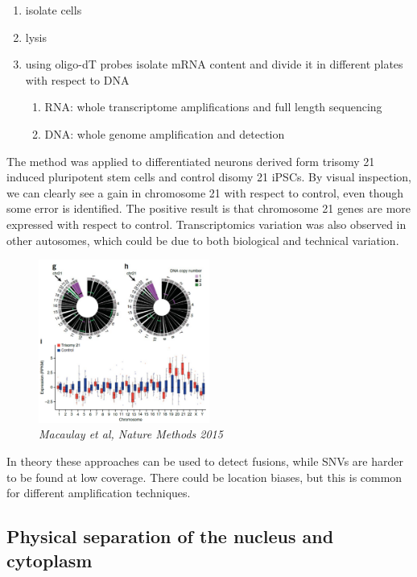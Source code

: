 \begin{enumerate}
\def\labelenumi{\arabic{enumi}.}
\tightlist
\item
  isolate cells
\item
  lysis
\item
  using oligo-dT probes isolate mRNA content and divide it in different
  plates with respect to DNA

  \begin{enumerate}
  \def\labelenumii{\arabic{enumii}.}
  \tightlist
  \item
    RNA: whole transcriptome amplifications and full length sequencing
  \item
    DNA: whole genome amplification and detection
  \end{enumerate}
\end{enumerate}

The method was applied to differentiated neurons derived form trisomy 21
induced pluripotent stem cells and control disomy 21 iPSCs. By visual
inspection, we can clearly see a gain in chromosome 21 with respect to
control, even though some error is identified. The positive
result is that chromosome 21 genes are more expressed with respect to
control. Transcriptomics variation was also observed in other autosomes,
which could be due to both biological and technical variation.

\begin{figure}
\centering
\includegraphics[width=0.5\textwidth]{images/Screenshot_3.png}
\caption{\emph{Macaulay et al, Nature Methods 2015}}
\end{figure}


In theory these approaches can be used to detect fusions, while SNVs are
harder to be found at low coverage. There could be location biases, but
this is common for different amplification techniques.

\hypertarget{physical-separation-of-the-nucleus-and-cytoplasm}{%
\subsection{Physical separation of the nucleus and
cytoplasm}\label{physical-separation-of-the-nucleus-and-cytoplasm}}

